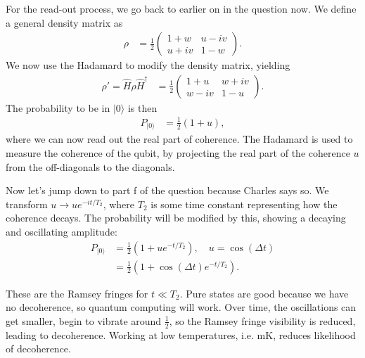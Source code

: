 \documentclass[a4paper, 11pt, normalem]{report}
\begin{document}
\begin{example}
    For the read-out process, we go back to earlier on in the question now.
    We define a general density matrix as
    \begin{align}
        \rho &=  \frac12\begin{pmatrix} 1+w & u-iv \\ u+iv & 1-w\end{pmatrix}.
    \end{align}
    We now use the Hadamard to modify the density matrix, yielding
    \begin{align}
        \rho'= \hat{H}\rho\hat{H}^\dagger &= \frac12\begin{pmatrix} 1+u & w+iv \\ w-iv & 1-u\end{pmatrix}.
    \end{align}
    The probability to be in $|0\rangle$ is then
    \begin{align}
        P_{|0\rangle} &= \frac12(1+u),
    \end{align}
    where we can now read out the real part of coherence.
    The Hadamard is used to measure the coherence of the qubit, by projecting the real part of the coherence $u$ from the off-diagonals to the diagonals.

    Now let's jump down to part f of the question because Charles says so.
    We transform $u\to ue^{-it/T_2}$, where $T_2$ is some time constant representing how the coherence decays.
    The probability will be modified by this, showing a decaying and oscillating amplitude:
    \begin{align}
        P_{|0\rangle} &= \frac12(1+ue^{-t/T_2}),\quad u=\cos(\Delta t) \\
                      &= \frac12(1+\cos(\Delta t)e^{-t/T_2}).
    \end{align}
    \begin{figure}[H]
        \centering
    \end{figure}
    These are the Ramsey fringes for $t\ll T_2$.
    Pure states are good because we have no decoherence, so quantum computing will work.
    Over time, the oscillations can get smaller, begin to vibrate around $\frac12$, so the Ramsey fringe visibility is reduced, leading to decoherence.
    Working at low temperatures, i.e. mK, reduces likelihood of decoherence.
\end{example}
\end{document}
